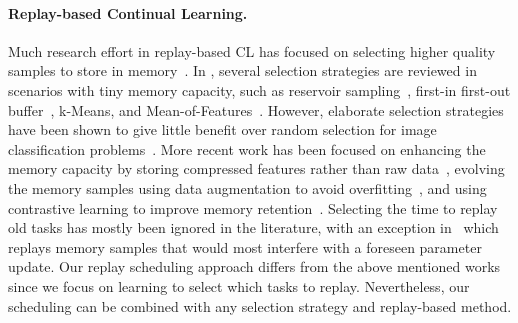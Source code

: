 \paragraph{Replay-based Continual Learning.} 
Much research effort in replay-based CL has focused on selecting higher quality samples to store in memory~\cite{aljundi2019gradient, borsos2020coresets, chaudhry2019tiny, chrysakis2020online, hayes2019memory, isele2018selective, lopez2017gradient, nguyen2017variational, rebuffi2017icarl, yoon2021online}. In \cite{chaudhry2019tiny}, several selection strategies are reviewed in scenarios with tiny memory capacity, such as reservoir sampling~\cite{vitter1985random}, first-in first-out buffer~\cite{lopez2017gradient}, k-Means, and Mean-of-Features~\cite{rebuffi2017icarl}. However, elaborate selection strategies have been shown to give little benefit over random selection for image classification problems~\cite{chaudhry2018riemannian, hayes2020remind}. 
More recent work has been focused on enhancing the memory capacity by storing compressed features rather than raw data~\cite{hayes2020remind, iscen2020memory, pellegrini2019latent}, evolving the memory samples using data augmentation to avoid overfitting~\cite{jin2020gradient,bang2021rainbow}, and using contrastive learning to improve memory retention~\cite{cha2021co2l,mai2021supervised}. 
Selecting the time to replay old tasks has mostly been ignored in the literature, with an exception in~\cite{aljundi2019online} which replays memory samples that would most interfere with a foreseen parameter update. Our replay scheduling approach differs from the above mentioned works since we focus on learning to select which tasks to replay. Nevertheless, our scheduling can be combined with any selection strategy and replay-based method.


